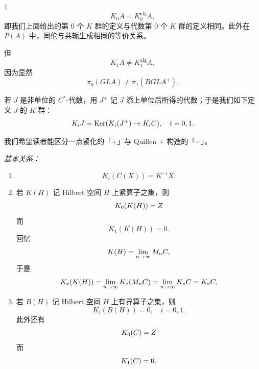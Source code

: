 
\begin{lem}{1}
\[
  K_0 A = K_0^{\mathrm{alg}} A,
\]
即我们上面给出的第 0 个 $K$ 群的定义与代数第 0 个 $K$ 群的定义相同。此外在 $P(A)$ 中，同伦与共轭生成相同的等价关系。
\end{lem}

但
\[
  K_1 A \neq K_1^{\mathrm{alg}} A,
\]
因为显然
\[
  \pi_0(GL A) \neq \pi_1(BGL A^+).
\]


若 $J$ 是非单位的 $C^*$-代数，用 $J^+$ 记 $J$ 添上单位后所得的代数；于是我们如下定义 $J$ 的 $K$ 群：
\[
  K_i J = \operatorname{Ker}(K_i(J^+)\to K_iC), \quad i = 0,1.
\]

我们希望读者能区分一点紧化的「$+$」与 Quillen $+$ 构造的「$+$」。

\emph{基本关系：}
\begin{enumerate}[label=\arabic*.]
\item
  \[
    K_i(C(X)) = K^{-i}X.
  \]
\item 若 $K(H)$ 记 Hilbert 空间 $H$ 上紧算子之集，则
  \[
    K_0(K(H)) = Z
  \]
  而
  \[
    K_1(K(H)) = 0.
  \]
  回忆
  \[
    K(H) = \lim_{n\to\infty} M_nC,
  \]
  于是
  \[
    K_*(K(H)) = \lim_{n\to\infty} K_*(M_nC) = \lim_{n\to\infty} K_*C = K_*C.
  \]
\item 若 $B(H)$ 记 Hilbert 空间 $H$ 上有界算子之集，则
  \[
    K_i(B(H)) = 0, \quad i = 0,1.
  \]
  此外还有
  \[
    K_0(C) = Z
  \]
  而
  \[
    K_1(C) = 0.
  \]
\end{enumerate}

